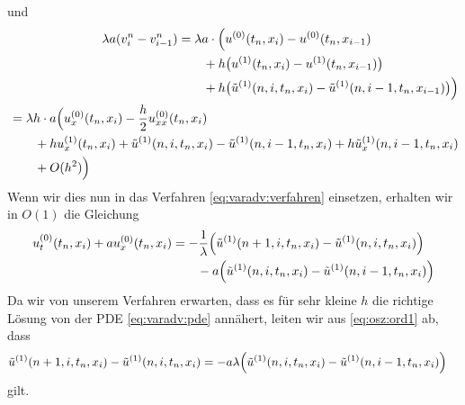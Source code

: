 und
{\small
\begin{align*}
\begin{split}
\lambda a (v^n_{i} - v^n_{i-1}) &= \lambda a \cdot \Bigl( u^{(0)}(t_n, x_i) - u^{(0)}(t_n, x_{i-1})\\
&\qquad + h \bigl( u^{(1)}(t_n, x_i) - u^{(1)}(t_n, x_{i-1}) \bigr)\\
&\qquad +  h \bigl( \tilde u^{(1)}(n, i, t_n, x_i) - \tilde u^{(1)}(n, i-1, t_n, x_{i-1}) \bigr) \Bigr)
\end{split}\\
\begin{split}
&= \lambda h \cdot a  \Bigl( u^{(0)}_x(t_n, x_i) - \frac {h} 2 u^{(0)}_{xx}(t_n, x_i)\\
&\qquad + h u^{(1)}_x(t_n, x_i) +  \tilde u^{(1)}(n, i, t_n, x_i) - \tilde u^{(1)}(n, i-1, t_n, x_i) + h \tilde u^{(1)}_x(n, i-1, t_n, x_i)\\
&\qquad + O(h^2) \Bigr)
\end{split}
\end{align*}
}
Wenn wir dies nun in das Verfahren \eqref{eq:varadv:verfahren} einsetzen, erhalten wir in $O(1)$ die Gleichung
\begin{align}\label{eq:osz:ord1}
\begin{split}
u^{(0)}_t(t_n, x_i) + a u^{(0)}_x(t_n, x_i)
&= - \frac 1 \lambda \Bigl(  \tilde u^{(1)}(n+1, i, t_n, x_i) - \tilde u^{(1)}(n, i, t_n, x_i) \Bigr)
\\&\qquad - a \Bigl( \tilde u^{(1)}(n, i, t_n, x_i) - \tilde u^{(1)}(n, i-1, t_n, x_i) \Bigr)
\end{split}
\end{align}
Da wir von unserem Verfahren erwarten, dass es für sehr kleine $h$ die richtige Lösung von der PDE \eqref{eq:varadv:pde} annähert, leiten wir aus \eqref{eq:osz:ord1} ab, dass
\begin{align}
\tilde u^{(1)}(n+1, i, t_n, x_i) - \tilde u^{(1)}(n, i, t_n, x_i)
&= - a \lambda \Bigl( \tilde u^{(1)}(n, i, t_n, x_i) - \tilde u^{(1)}(n, i-1, t_n, x_i) \Bigr)
\end{align}
gilt.


